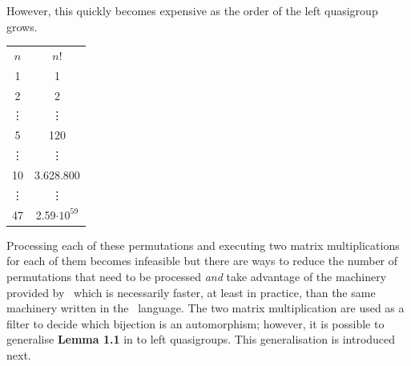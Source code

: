 \documentclass{mcom-l}
\begin{document}
\noindent However, this quickly becomes expensive as the order of the left quasigroup grows. 
 \begin{center}
        \begin{tabular}{|c|c|}
         $n$ & $n!$\\
         1 & 1\\
         2 & 2\\
         \vdots & \vdots \\
         5 & 120 \\
         \vdots & \vdots \\
         10 & 3.628.800\\
         \vdots & \vdots \\
         47 & 2.59$\cdot 10^{59}$
         
    \end{tabular}
    
    \end{center}
Processing each of these permutations and executing two matrix multiplications for each of them becomes infeasible but there are ways to reduce the number of permutations that need to be processed \emph{and} take advantage of the machinery provided by \magma~which is necessarily faster, at least in practice, than the same machinery written in the \magma~language. The two matrix multiplication are used as a filter to decide which bijection is an automorphism; however, it is possible to generalise \textbf{Lemma 1.1} in \cite{phdStanov} to left quasigroups. This generalisation is introduced next. 
\end{document}

